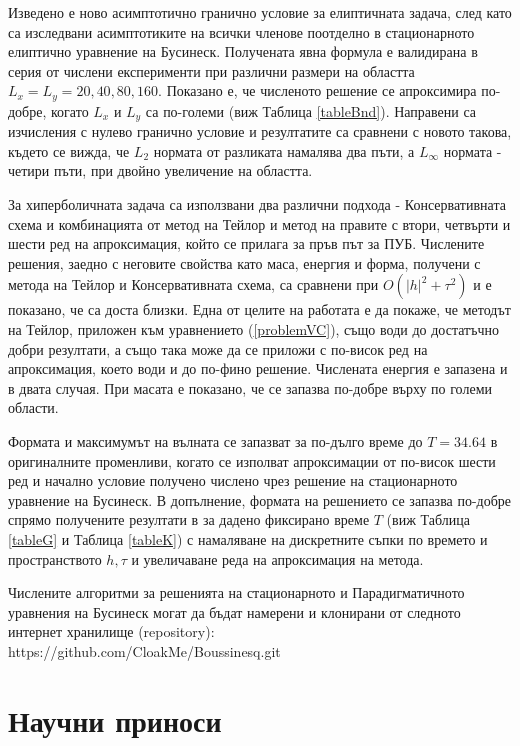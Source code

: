 \documentclass[a4paper]{article}
\newcommand{\rf}[1]{(\ref{#1})}
\theoremstyle{remark}
\begin{document}
\begin{large}
Изведено е ново асимптотично гранично условие за елиптичната задача, след като са изследвани асимптотиките на всички членове поотделно в стационарното елиптично уравнение на Бусинеск. Получената явна формула е валидирана в серия от числени експерименти при различни размери на областта $L_x=L_y=20,40,80,160$. Показано е, че численото решение се апроксимира по-добре, когато $L_x$ и $L_y$ са по-големи (виж Таблица \ref{tableBnd}). Направени са изчисления с нулево гранично условие и резултатите са сравнени с новото такова, където се вижда, че $L_2$ нормата от разликата намалява два пъти, а $L_\infty$ нормата - четири пъти, при двойно увеличение на областта.

За хиперболичната задача са използвани два различни подхода - Консервативната схема и комбинацията от метод на Тейлор и метод на правите с втори, четвърти и шести ред на апроксимация, който се прилага за пръв път за ПУБ. Числените решения, заедно с неговите свойства като маса, енергия и форма, получени с метода на Тейлор и Консервативната схема, са сравнени при $O(|h|^2 + \tau^2)$ и е показано, че са доста близки. Една от целите на работата е да покаже, че методът на Тейлор, приложен към уравнението \rf{problemVC}, също води до достатъчно добри резултати, а също така може да се приложи с по-висок ред на апроксимация, което води и до по-фино решение. Числената енергия е запазена и в двата случая. При масата е показано, че се запазва по-добре върху по големи области. 

Формата и максимумът на вълната се запазват за по-дълго време до $T=34.64$ в оригиналните променливи, когато се изполват апроксимации от по-висок шести ред и начално условие получено числено чрез решение на стационарното уравнение на Бусинеск. В допълнение, формата на решението се запазва по-добре спрямо получените резултати в \cite{ref21, ref20, ref23, ref22, ref24} за дадено фиксирано време $T$ (виж Таблица \ref{tableG} и Таблица \ref{tableK}) с намаляване на дискретните съпки по времето и пространството $h, \tau$ и увеличаване реда на апроксимация на метода.

Числените алгоритми за решенията на стационарното и Парадигматичното уравнения на Бусинеск могат да бъдат намерени и клонирани от следното интернет хранилище (repository):\\
https://github.com/CloakMe/Boussinesq.git

\newpage
\section{Научни приноси}


\end{large}
\end{document}
